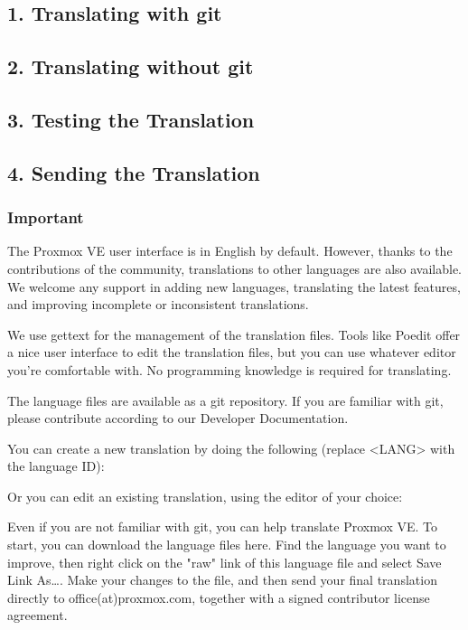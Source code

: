 \subsection{1. Translating with git}

\subsection{2. Translating without git}

\subsection{3. Testing the Translation}

\subsection{4. Sending the Translation}

\subsubsection{Important}

The Proxmox VE user interface is in English by default. However, thanks to the contributions of the community, translations to other languages are also available. We welcome any support in adding new languages, translating the latest features, and improving incomplete or inconsistent translations.

We use gettext for the management of the translation files. Tools like Poedit offer a nice user interface to edit the translation files, but you can use whatever editor you’re comfortable with. No programming knowledge is required for translating.

The language files are available as a git repository. If you are familiar with git, please contribute according to our Developer Documentation.

You can create a new translation by doing the following (replace <LANG> with the language ID):

Or you can edit an existing translation, using the editor of your choice:

Even if you are not familiar with git, you can help translate Proxmox VE. To start, you can download the language files here. Find the language you want to improve, then right click on the "raw" link of this language file and select Save Link As…. Make your changes to the file, and then send your final translation directly to office(at)proxmox.com, together with a signed contributor license agreement.

